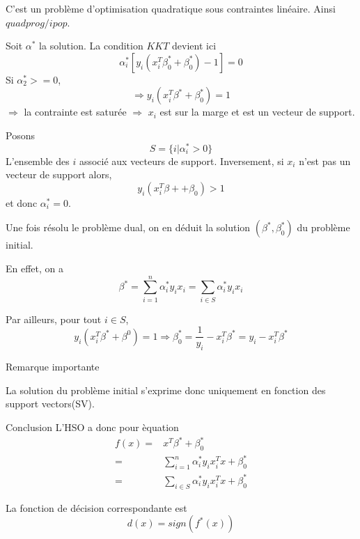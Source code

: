 \documentclass{article}
\begin{document}
C'est un probl\`eme d'optimisation quadratique sous contraintes lin\'eaire.
Ainsi $quadprog/ipop$.

Soit $\alpha^*$ la solution. La condition $KKT$ devient ici
\begin{equation}
\alpha_i^*[y_i(x_i^T\beta_0^*+\beta_0^*)-1]=0
\end{equation}
Si $\alpha_2^*>=0$,
\begin{equation}
\Rightarrow y_i(x_i^T\beta^*+\beta_0^*)=1
\end{equation}
$\Rightarrow$ la contrainte est satur\'ee
$\Rightarrow$ $x_i$  est sur la marge et est un vecteur de support.

Posons
\begin{equation}
S=\{i|\alpha_i^*>0\}
\end{equation}
L'ensemble des $i$ associ\'e aux vecteurs de support. Inversement, si $x_i$ n'est pas un vecteur de support alors,
\begin{equation}
y_i(x_i^T\beta++\beta_0)>1
\end{equation}
et donc $\alpha_i^*=0$.

Une fois r\'esolu le probl\`eme dual, on en d\'eduit la solution $(\beta^*,\beta^*_0)$ du probl\`eme initial.

En effet, on a
\begin{equation}
\beta^*=\sum_{i=1}^n\alpha_i^* y_i x_i=\sum_{i\in S}\alpha_i^* y_i x_i
\end{equation}

Par ailleurs, pour tout  $i\in S$,
\begin{equation}
y_i(x_i^T\beta^*+\beta^0)=1\Rightarrow \beta_0^*=\frac{1}{y_i}-x_i^T\beta^*=y_i-x_i^T\beta^*
\end{equation}

Remarque importante

La solution du probl\`eme initial s'exprime donc uniquement en fonction des support vectors(SV).

Conclusion
L'HSO a donc pour \`equation
\begin{equation}
\begin{split}
	f(x)=&x^T\beta^*+\beta^*_0\\
=&\sum_{i=1}^n\alpha_i^* y_i x_i^Tx+\beta_0^*\\
=&\sum_{i\in S}\alpha_i^*y_ix_i^T x+\beta_0^*
\end{split}
\end{equation}

La fonction de d\'ecision correspondante est 
\begin{equation}
d(x)=sign(f^*(x))
\end{equation}
\end{document}
